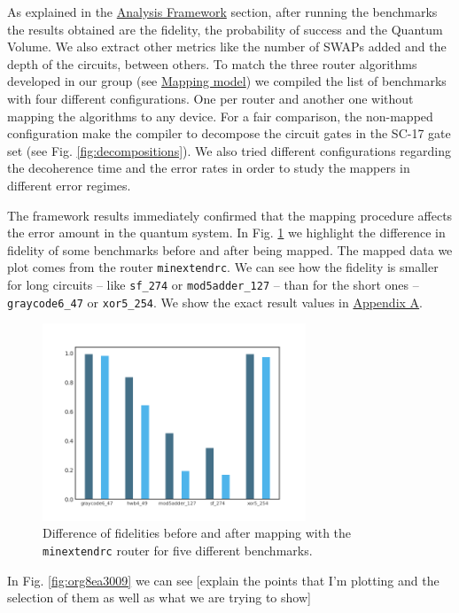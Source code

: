 \label{tab:map_selected_benchs}

As explained in the \href{chapter-4.org}{Analysis Framework} section, after running the benchmarks the results obtained are the fidelity, the probability of success and the Quantum Volume.
We also extract other metrics like the number of SWAPs added and the depth of the circuits, between others.
To match the three router algorithms developed in our group (see \href{chapter-3.org}{Mapping model}) we compiled the list of benchmarks with four different configurations.
One per router and another one without mapping the algorithms to any device.
For a fair comparison, the non-mapped configuration make the compiler to decompose the circuit gates in the SC-17 gate set (see Fig. \ref{fig:decompositions}).
We also tried different configurations regarding the decoherence time and the error rates in order to study the mappers in different error regimes.


The framework results immediately confirmed that the mapping procedure affects the error amount in the quantum system.
In Fig. \ref{fig:org5ac291a} we highlight the difference in fidelity of some benchmarks before and after being mapped.
The mapped data we plot comes from the router \texttt{minextendrc}.
We can see how the fidelity is smaller for long circuits -- like \texttt{sf\_274} or \texttt{mod5adder\_127} -- than for the short ones -- \texttt{graycode6\_47} or \texttt{xor5\_254}.
We show the exact result values in \href{appendix-1.org}{Appendix A}.

\begin{figure}[htbp]
\centering
\includegraphics[width=0.7\textwidth]{figures/f_diff_bar_plot.png}
\caption{\label{fig:org5ac291a}
Difference of fidelities before and after mapping with the \texttt{minextendrc} router for five different benchmarks.}
\end{figure}
In Fig. \ref{fig:org8ea3009} we can see [explain the points that I'm plotting and the selection of them as well as what we are trying to show]

